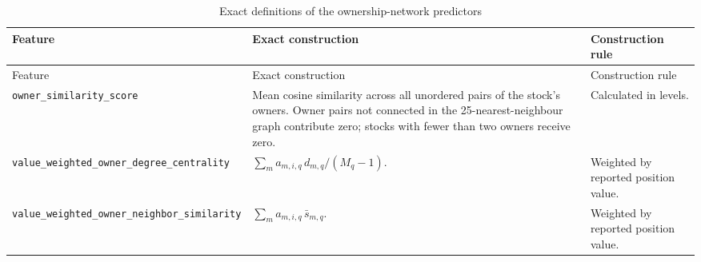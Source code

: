 \begingroup
\scriptsize
\setlength{\tabcolsep}{4pt}
\renewcommand{\arraystretch}{1.15}
\begin{longtable}{>{\raggedright\arraybackslash}p{}>{\raggedright\arraybackslash}p{}>{\raggedright\arraybackslash}p{}}
        \caption{Exact definitions of the ownership-network predictors}
        \label{tab:network-feature-definitions}                                                                                                                                                                                             \\
        \toprule
        Feature & Exact construction                                                                                                                                                                                    & Construction rule \\
        \midrule
        \endfirsthead
        \toprule
        Feature & Exact construction                                                                                                                                                                                    & Construction rule \\
        \midrule
        \endhead
        \bottomrule
        \endfoot
        \nolinkurl{owner_similarity_score}
                & Mean cosine similarity across all unordered pairs of the stock's owners. Owner pairs not connected in the 25-nearest-neighbour graph contribute zero; stocks with fewer than two owners receive zero.
                & Calculated in levels.                                                                                                                                                                                                     \\
        \nolinkurl{value_weighted_owner_degree_centrality}
                & $\sum_m a_{m,i,q}\,d_{m,q}/(M_q-1)$.
                & Weighted by reported position value.                                                                                                                                                                                      \\
        \nolinkurl{value_weighted_owner_neighbor_similarity}
                & $\sum_m a_{m,i,q}\,\bar{s}_{m,q}$.
                & Weighted by reported position value.                                                                                                                                                                                      \\

\end{longtable}
